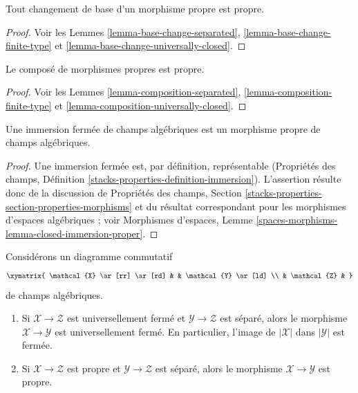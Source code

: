 \begin{lemma}
\label{lemma-base-change-proper}
Tout changement de base d'un morphisme propre est propre.
\end{lemma}

\begin{proof}
Voir les
Lemmes \ref{lemma-base-change-separated},
\ref{lemma-base-change-finite-type} et
\ref{lemma-base-change-universally-closed}.
\end{proof}

\begin{lemma}
\label{lemma-composition-proper}
Le composé de morphismes propres est propre.
\end{lemma}

\begin{proof}
Voir les
Lemmes \ref{lemma-composition-separated},
\ref{lemma-composition-finite-type} et
\ref{lemma-composition-universally-closed}.
\end{proof}

\begin{lemma}
\label{lemma-closed-immersion-proper}
Une immersion fermée de champs algébriques est un morphisme propre de
champs algébriques.
\end{lemma}

\begin{proof}
Une immersion fermée est, par définition, représentable
(Propriétés des champs, Définition
\ref{stacks-properties-definition-immersion}).
L'assertion résulte donc de la discussion de
Propriétés des champs, Section
\ref{stacks-properties-section-properties-morphisms}
et du résultat correspondant pour les morphismes d'espaces algébriques ; voir
Morphismes d'espaces, Lemme
\ref{spaces-morphisms-lemma-closed-immersion-proper}.
\end{proof}

\begin{lemma}
\label{lemma-universally-closed-permanence}
Considérons un diagramme commutatif
$$
\xymatrix{
\mathcal{X} \ar[rr] \ar[rd] & &
\mathcal{Y} \ar[ld] \\
& \mathcal{Z} &
}
$$
de champs algébriques.
\begin{enumerate}
\item Si $\mathcal{X} \to \mathcal{Z}$ est universellement fermé et
$\mathcal{Y} \to \mathcal{Z}$ est séparé,
alors le morphisme $\mathcal{X} \to \mathcal{Y}$ est universellement fermé.
En particulier, l'image de $|\mathcal{X}|$ dans $|\mathcal{Y}|$ est fermée.
\item Si $\mathcal{X} \to \mathcal{Z}$ est propre et
$\mathcal{Y} \to \mathcal{Z}$ est séparé, alors
le morphisme $\mathcal{X} \to \mathcal{Y}$ est propre.
\end{enumerate}
\end{lemma}

